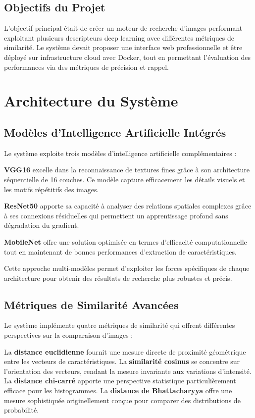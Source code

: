 \documentclass[12pt,a4paper]{article}
\begin{document}
\subsection{Objectifs du Projet}

L'objectif principal était de créer un moteur de recherche d'images performant exploitant plusieurs descripteurs deep learning avec différentes métriques de similarité. Le système devait proposer une interface web professionnelle et être déployé sur infrastructure cloud avec Docker, tout en permettant l'évaluation des performances via des métriques de précision et rappel.

\section{Architecture du Système}

\subsection{Modèles d'Intelligence Artificielle Intégrés}

\begin{implementedbox}
Le système exploite trois modèles d'intelligence artificielle complémentaires :

\textbf{VGG16} excelle dans la reconnaissance de textures fines grâce à son architecture séquentielle de 16 couches. Ce modèle capture efficacement les détails visuels et les motifs répétitifs des images.

\textbf{ResNet50} apporte sa capacité à analyser des relations spatiales complexes grâce à ses connexions résiduelles qui permettent un apprentissage profond sans dégradation du gradient.

\textbf{MobileNet} offre une solution optimisée en termes d'efficacité computationnelle tout en maintenant de bonnes performances d'extraction de caractéristiques.
\end{implementedbox}

Cette approche multi-modèles permet d'exploiter les forces spécifiques de chaque architecture pour obtenir des résultats de recherche plus robustes et précis.

\subsection{Métriques de Similarité Avancées}

\begin{implementedbox}
Le système implémente quatre métriques de similarité qui offrent différentes perspectives sur la comparaison d'images :

La \textbf{distance euclidienne} fournit une mesure directe de proximité géométrique entre les vecteurs de caractéristiques. La \textbf{similarité cosinus} se concentre sur l'orientation des vecteurs, rendant la mesure invariante aux variations d'intensité. La \textbf{distance chi-carré} apporte une perspective statistique particulièrement efficace pour les histogrammes. La \textbf{distance de Bhattacharyya} offre une mesure sophistiquée originellement conçue pour comparer des distributions de probabilité.
\end{implementedbox}
\end{document}
